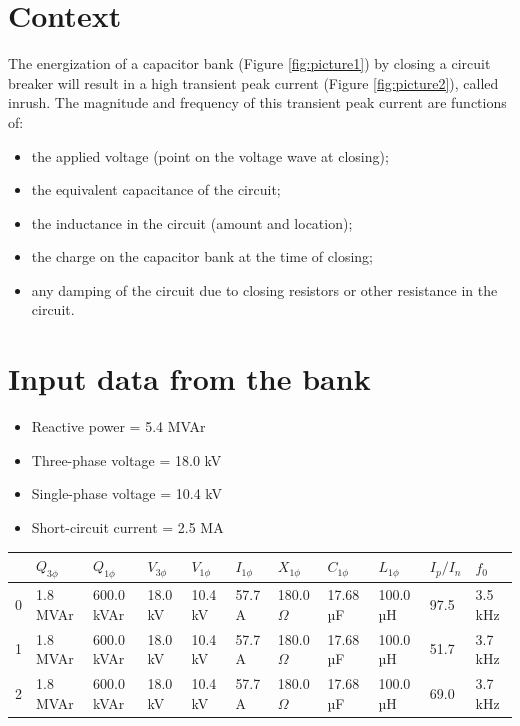 \documentclass[a4paper]{article}
\begin{document}
	
	\section{Context}
	The energization of a capacitor bank (Figure \ref{fig:picture1}) by closing a circuit breaker will result in a high transient peak current (Figure \ref{fig:picture2}), called inrush. The magnitude and frequency of this transient peak current are functions of:
	\begin{itemize}[label=\textendash]
		\item the applied voltage (point on the voltage wave at closing);
		\item the equivalent capacitance of the circuit;
		\item the inductance in the circuit (amount and location);
		\item the charge on the capacitor bank at the time of closing;
		\item any damping of the circuit due to closing resistors or other resistance in the circuit.
	\end{itemize}
	
	\section{Input data from the bank}
	\begin{itemize}[label=\textendash]
		\item Reactive power  = {{5.4 MVAr}}
		\item Three-phase voltage  = {{18.0 kV}}
		\item Single-phase voltage  = {{10.4 kV}}
		\item Short-circuit current  = {{2.5 MA}}
	\end{itemize}
	
	\begin{center}
		\begin{tabular}{lllllllllll}
\toprule
 & $Q_{3\phi}$ & $Q_{1\phi}$ & $V_{3\phi}$ & $V_{1\phi}$ & $I_{1\phi}$ & $X_{1\phi}$ & $C_{1\phi}$ & $L_{1\phi}$ & $I_{p}/I_{n}$ & $f_{0}$ \\
\midrule
0 & 1.8 MVAr & 600.0 kVAr & 18.0 kV & 10.4 kV & 57.7 A & 180.0 $\Omega$ & 17.68 µF & 100.0 µH & 97.5 & 3.5 kHz \\
1 & 1.8 MVAr & 600.0 kVAr & 18.0 kV & 10.4 kV & 57.7 A & 180.0 $\Omega$ & 17.68 µF & 100.0 µH & 51.7 & 3.7 kHz \\
2 & 1.8 MVAr & 600.0 kVAr & 18.0 kV & 10.4 kV & 57.7 A & 180.0 $\Omega$ & 17.68 µF & 100.0 µH & 69.0 & 3.7 kHz \\
\bottomrule
\end{tabular}

	\end{center}
	
\end{document}
